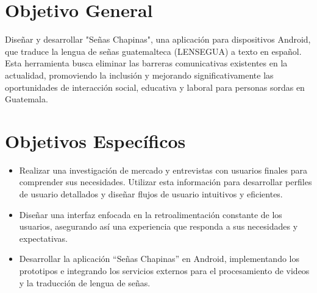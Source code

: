 \section{Objetivo General}
Diseñar y desarrollar "Señas Chapinas", una aplicación para dispositivos Android, que traduce la lengua de señas guatemalteca (LENSEGUA) a texto en español. Esta herramienta busca eliminar las barreras comunicativas existentes en la actualidad, promoviendo la inclusión y mejorando significativamente las oportunidades de interacción social, educativa y laboral para personas sordas en Guatemala.

\section{Objetivos Específicos}
\begin{itemize}

\item Realizar una investigación de mercado y entrevistas con usuarios finales para comprender sus necesidades. Utilizar esta información para desarrollar perfiles de usuario detallados y diseñar flujos de usuario intuitivos y eficientes. 

\item Diseñar una interfaz enfocada en la retroalimentación constante de los usuarios, asegurando así una experiencia que responda a sus necesidades y expectativas. 

\item Desarrollar la aplicación ``Señas Chapinas'' en Android, implementando los prototipos e integrando los servicios externos para el procesamiento de videos y la traducción de lengua de señas.

\end{itemize}